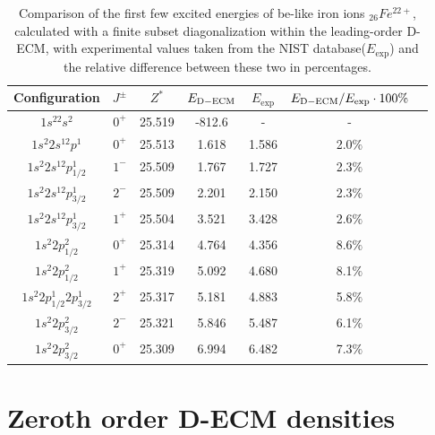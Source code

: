   \begin{table}[h!]
\begin{tabular}{cc|ccccc}
  Configuration & $J^{\pm}$ & $Z^{*}$ & $E_{\rm{D-ECM}}$ & $E_{\mathrm{exp}}$
  & $E_{\rm{D-ECM}}/E_{\mathrm{exp}} \cdot 100\%$ \\
  \hline
 \hline 
    $1s^22s^2$ & $0^+$ & 25.519 & -812.6 & - & -\\
    $1s^2 2s^12p^1$ & $0^+$ & 25.513 & 1.618 & 1.586 & 2.0$\%$\\
    $1s^2 2s^12p^1_{1/2}$ & $1^-$ & 25.509 & 1.767 & 1.727 & 2.3$\%$\\
    $1s^2 2s^12p^1_{3/2}$ & $2^-$ & 25.509 & 2.201 & 2.150 & 2.3$\%$\\
    $1s^2 2s^12p^1_{3/2}$ & $1^+$ & 25.504 & 3.521 & 3.428 & 2.6$\%$\\
    $1s^2 2p^2_{1/2}$ & $0^+$ & 25.314 & 4.764 & 4.356 & 8.6$\%$\\
    $1s^2 2p^2_{1/2}$ & $1^+$ & 25.319 & 5.092 & 4.680 & 8.1$\%$\\
    $1s^2 2p^1_{1/2} 2p^1_{3/2}$ & $2^+$ & 25.317 & 5.181 & 4.883 & 5.8$\%$\\
    $1s^2 2p^2_{3/2}$ & $2^-$ & 25.321 & 5.846 & 5.487 & 6.1$\%$\\
    $1s^2 2p^2_{3/2}$ & $0^+$ & 25.309 & 6.994 & 6.482 & 7.3$\%$\\
    \hline
\end{tabular}
  \caption{Comparison of the first few excited energies of be-like iron ions ${}_{26}Fe^{22+}$, calculated with a finite subset diagonalization within the leading-order D-ECM, with experimental values taken from the NIST database($E_{\mathrm{exp}}$) and the relative difference between these two in percentages.}
  \label{tab:Ions2}
\end{table}

\newpage
\section{Zeroth order D-ECM densities}
\label{app:zeroDensities}


